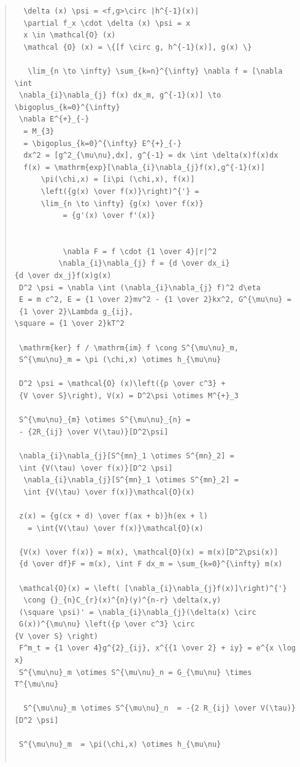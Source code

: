 \documentclass{jsarticle}
\begin{document}
\begin{quote}
\begin{verbatim}
  \delta (x) \psi = <f,g>\circ |h^{-1}(x)| 
  \partial f_x \cdot \delta (x) \psi = x 
  x \in \mathcal{O} (x) 
  \mathcal {O} (x) = \{[f \circ g, h^{-1}(x)], g(x) \} 

   \lim_{n \to \infty} \sum_{k=n}^{\infty} \nabla f = [\nabla \int 
 \nabla_{i}\nabla_{j} f(x) dx_m, g^{-1}(x)] \to \bigoplus_{k=0}^{\infty}  
 \nabla E^{+}_{-} 
  = M_{3} 
  = \bigoplus_{k=0}^{\infty} E^{+}_{-} 
  dx^2 = [g^2_{\mu\nu},dx], g^{-1} = dx \int \delta(x)f(x)dx 
  f(x) = \mathrm{exp}[\nabla_{i}\nabla_{j}f(x),g^{-1}(x)] 
	  \pi(\chi,x) = [i\pi (\chi,x), f(x)] 
	  \left({g(x) \over f(x)}\right)^{'} =
	  \lim_{n \to \infty} {g(x) \over f(x)} 
           = {g'(x) \over f'(x)} 


		   \nabla F = f \cdot {1 \over 4}|r|^2
		  \nabla_{i}\nabla_{j} f = {d \over dx_i}
{d \over dx_j}f(x)g(x) 
 D^2 \psi = \nabla \int (\nabla_{i}\nabla_{j} f)^2 d\eta 
 E = m c^2, E = {1 \over 2}mv^2 - {1 \over 2}kx^2, G^{\mu\nu} = 
 {1 \over 2}\Lambda g_{ij}, 
\square = {1 \over 2}kT^2 

 \mathrm{ker} f / \mathrm{im} f \cong S^{\mu\nu}_m, 
 S^{\mu\nu}_m = \pi (\chi,x) \otimes h_{\mu\nu} 

 D^2 \psi = \mathcal{O} (x)\left({p \over c^3} + 
 {V \over S}\right), V(x) = D^2\psi \otimes M^{+}_3 

 S^{\mu\nu}_{m} \otimes S^{\mu\nu}_{n} = 
 - {2R_{ij} \over V(\tau)}[D^2\psi] 

 \nabla_{i}\nabla_{j}[S^{mn}_1 \otimes S^{mn}_2] = 
 \int {V(\tau) \over f(x)}[D^2 \psi] 
  \nabla_{i}\nabla_{j}[S^{mn}_1 \otimes S^{mn}_2] = 
  \int {V(\tau) \over f(x)}\mathcal{O}(x) 

 z(x) = {g(cx + d) \over f(ax + b)}h(ex + l) 
   = \int{V(\tau) \over f(x)}\mathcal{O}(x) 

 {V(x) \over f(x)} = m(x), \mathcal{O}(x) = m(x)[D^2\psi(x)] 
 {d \over df}F = m(x), \int F dx_m = \sum_{k=0}^{\infty} m(x) 

 \mathcal{O}(x) = \left( [\nabla_{i}\nabla_{j}f(x)]\right)^{'} 
  \cong {}_{n}C_{r}(x)^{n}(y)^{n-r} \delta(x,y) 
 (\square \psi)' = \nabla_{i}\nabla_{j}(\delta(x) \circ 
 G(x))^{\mu\nu} \left({p \over c^3} \circ 
{V \over S} \right) 
 F^m_t = {1 \over 4}g^{2}_{ij}, x^{{1 \over 2} + iy} = e^{x \log x} 
 S^{\mu\nu}_m \otimes S^{\mu\nu}_n = G_{\mu\nu} \times T^{\mu\nu} 

  S^{\mu\nu}_m \otimes S^{\mu\nu}_n  = -{2 R_{ij} \over V(\tau)}[D^2 \psi] 

 S^{\mu\nu}_m  = \pi(\chi,x) \otimes h_{\mu\nu} 


\end{verbatim}
\end{quote}
\end{document}
